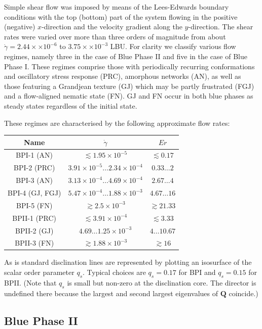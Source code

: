 \documentclass[8.5pt,twoside,twocolumn]{article}
\newcommand{\e}[1]{\times10^{#1}}
\newcommand{\gd}{\dot{\gamma}}
\begin{document}
Simple shear flow was imposed by means of the Lees-Edwards boundary
conditions with
the top (bottom) part of the system flowing in the positive (negative) $x$-direction and the 
velocity gradient along the $y$-direction.
The shear rates were varied over more than three orders of magnitude from about 
$\gd=2.44\times \e{-6}$ to $3.75\times\e{-3}$ LBU.
For clarity we classify various flow regimes, namely three in the case of Blue Phase II and five in the 
case of Blue Phase I. These regimes comprise those with periodically recurring conformations and oscillatory stress response (PRC), 
amorphous networks (AN), as well as those featuring a Grandjean texture (GJ) which 
may be partly frustrated (FGJ) and a flow-aligned nematic state (FN). 
GJ and FN occur in both blue phases as steady states regardless of the initial state.

These regimes are characterised by the following approximate flow rates: 

\begin{table}[htpb]
\begin{tabular}{|c|c|c|}
\hline
Name & $\gd$ & $Er$ \\
\hline
BPI-1 (AN) & $ \lesssim 1.95\e{-5}$ & $\lesssim 0.17$ \\
BPI-2 (PRC) & $3.91\e{-5} \dots 2.34\e{-4}$ & $0.33 \dots 2$ \\
BPI-3 (AN) & $3.13\e{-4}\dots 4.69\e{-4}$ & $2.67 \dots 4$ \\
BPI-4 (GJ, FGJ) & $5.47\e{-4} \dots 1.88\e{-3}$ & $4.67 \dots 16$ \\
BPI-5 (FN) & $\gtrsim 2.5\e{-3}$ & $ \gtrsim 21.33$ \\
\hline
BPII-1 (PRC) & $\lesssim 3.91\e{-4}$ & $ \lesssim 3.33$\\
BPII-2 (GJ) & $4.69\dots 1.25\e{-3}$ & $4 \dots 10.67$ \\
BPII-3 (FN) &$\gtrsim 1.88\e{-3}$ & $ \gtrsim 16$ \\ 
\hline
\end{tabular}
\label{table2}
\end{table}

As is standard \cite{Henrich:2010b,Henrich:2012b} disclination lines are represented by plotting an isosurface of the scalar order parameter $q_s$. 
Typical choices are $q_s=0.17$ for BPI and $q_s=0.15$ for BPII.
(Note that $q_s$ is small but non-zero at the disclination core. 
The director is undefined there because the largest and second largest eigenvalues of ${\mathbf Q}$ coincide.)

\subsection{Blue Phase II}
\end{document}
